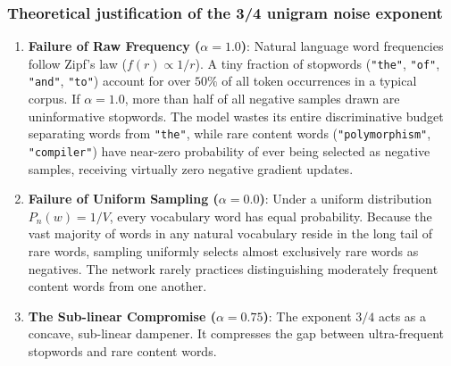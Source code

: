 \documentclass[../../../main.tex]{subfiles}
\begin{document}
\subsubsection{Theoretical justification of the 3/4 unigram noise exponent}
\begin{enumerate}
    \item \textbf{Failure of Raw Frequency ($\alpha = 1.0$)}: Natural language word frequencies follow Zipf's law ($f(r) \propto 1/r$). A tiny fraction of stopwords (\texttt{"the"}, \texttt{"of"}, \texttt{"and"}, \texttt{"to"}) account for over $50\%$ of all token occurrences in a typical corpus. If $\alpha = 1.0$, more than half of all negative samples drawn are uninformative stopwords. The model wastes its entire discriminative budget separating words from \texttt{"the"}, while rare content words (\texttt{"polymorphism"}, \texttt{"compiler"}) have near-zero probability of ever being selected as negative samples, receiving virtually zero negative gradient updates.
    
    \item \textbf{Failure of Uniform Sampling ($\alpha = 0.0$)}: Under a uniform distribution $P_n(w) = 1/V$, every vocabulary word has equal probability. Because the vast majority of words in any natural vocabulary reside in the long tail of rare words, sampling uniformly selects almost exclusively rare words as negatives. The network rarely practices distinguishing moderately frequent content words from one another.
    
    \item \textbf{The Sub-linear Compromise ($\alpha = 0.75$)}: The exponent $3/4$ acts as a concave, sub-linear dampener. It compresses the gap between ultra-frequent stopwords and rare content words.
\end{enumerate}
\end{document}
